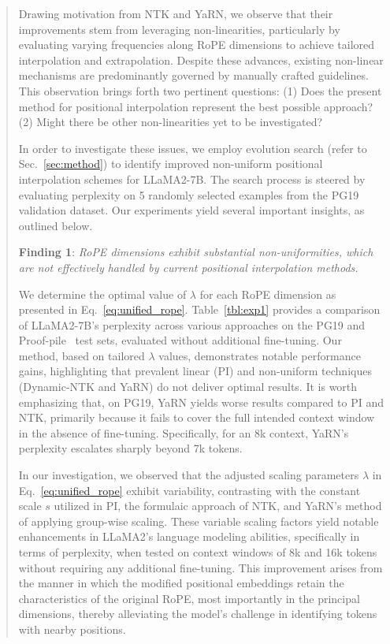 \begin{abstract}
Drawing motivation from NTK and YaRN, we observe that their improvements stem from leveraging non-linearities, particularly by evaluating varying frequencies along RoPE dimensions to achieve tailored interpolation and extrapolation. Despite these advances, existing non-linear mechanisms are predominantly governed by manually crafted guidelines. This observation brings forth two pertinent questions: (1) Does the present method for positional interpolation represent the best possible approach? (2) Might there be other non-linearities yet to be investigated?

In order to investigate these issues, we employ evolution search (refer to Sec.~\ref{sec:method}) to identify improved non-uniform positional interpolation schemes for LLaMA2-7B. The search process is steered by evaluating perplexity on 5 randomly selected examples from the PG19~\cite{pg19} validation dataset. Our experiments yield several important insights, as outlined below.

\textbf{Finding 1}: \textit{RoPE dimensions exhibit substantial non-uniformities, which are not effectively handled by current positional interpolation methods.}

We determine the optimal value of $\lambda$ for each RoPE dimension as presented in Eq.~\ref{eq:unified_rope}. Table~\ref{tbl:exp1} provides a comparison of LLaMA2-7B’s perplexity across various approaches on the PG19 and Proof-pile~\cite{proof-pile} test sets, evaluated without additional fine-tuning. Our method, based on tailored $\lambda$ values, demonstrates notable performance gains, highlighting that prevalent linear (PI) and non-uniform techniques (Dynamic-NTK and YaRN) do not deliver optimal results. It is worth emphasizing that, on PG19, YaRN yields worse results compared to PI and NTK, primarily because it fails to cover the full intended context window in the absence of fine-tuning. Specifically, for an 8k context, YaRN's perplexity escalates sharply beyond 7k tokens.

In our investigation, we observed that the adjusted scaling parameters $\lambda$ in Eq.~\ref{eq:unified_rope} exhibit variability, contrasting with the constant scale $s$ utilized in PI, the formulaic approach of NTK, and YaRN's method of applying group-wise scaling. These variable scaling factors yield notable enhancements in LLaMA2's language modeling abilities, specifically in terms of perplexity, when tested on context windows of 8k and 16k tokens without requiring any additional fine-tuning. This improvement arises from the manner in which the modified positional embeddings retain the characteristics of the original RoPE, most importantly in the principal dimensions, thereby alleviating the model’s challenge in identifying tokens with nearby positions.


\end{abstract}
